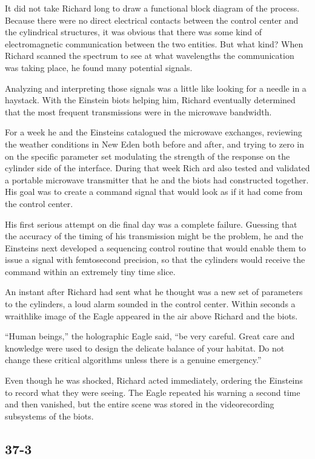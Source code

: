 \documentclass[]{article}
\begin{document}
{It did not take Richard long to draw a functional block diagram of the process. Because there were no direct electrical contacts between the control center and the cylindrical structures, it was obvious that there was some kind of electromagnetic communication between the two entities. But what kind? When Richard scanned the spectrum to see at what wavelengths the communication was taking place, he found many potential signals.

Analyzing and interpreting those signals was a little like looking for a needle in a haystack. With the Einstein biots helping him, Richard eventually determined that the most frequent transmissions were in the microwave bandwidth.

For a week he and the Einsteins catalogued the microwave exchanges, reviewing the weather conditions in New Eden both before and after, and trying to zero in on the specific parameter set modulating the strength of the response on the cylinder side of the interface. During that week Rich ard also tested and validated a portable microwave transmitter that he and the biots had constructed together. His goal was to create a command signal that would look as if it had come from the control center.

His first serious attempt on die final day was a complete failure. Guessing that the accuracy of the timing of his transmission might be the problem, he and the Einsteins next developed a sequencing control routine that would enable them to issue a signal with femtosecond precision, so that the cylinders would receive the command within an extremely tiny time slice.

An instant after Richard had sent what he thought was a new set of parameters to the cylinders, a loud alarm sounded in the control center. Within seconds a wraithlike image of the Eagle appeared in the air above Richard and the biots.

“Human beings,” the holographic Eagle said, “be very careful. Great care and knowledge were used to design the delicate balance of your habitat. Do not change these critical algorithms unless there is a genuine emergency.”

Even though he was shocked, Richard acted immediately, ordering the Einsteins to record what they were seeing. The Eagle repeated his warning a second time and then vanished, but the entire scene was stored in the videorecording subsystems of the biots.


\subsection{37-3}

}
\end{document}
